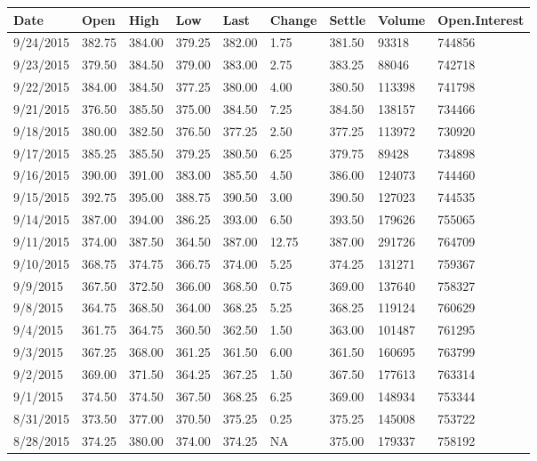 \documentclass[]{book}
\theoremstyle{definition}
\theoremstyle{definition}
\theoremstyle{remark}
\begin{document}
\begin{tabular}{l|l|l|l|l|l|l|l|l}
\hline
Date & Open & High & Low & Last & Change & Settle & Volume & Open.Interest\\
\hline
9/24/2015 & 382.75 & 384.00 & 379.25 & 382.00 & 1.75 & 381.50 & 93318 & 744856\\
\hline
9/23/2015 & 379.50 & 384.50 & 379.00 & 383.00 & 2.75 & 383.25 & 88046 & 742718\\
\hline
9/22/2015 & 384.00 & 384.50 & 377.25 & 380.00 & 4.00 & 380.50 & 113398 & 741798\\
\hline
9/21/2015 & 376.50 & 385.50 & 375.00 & 384.50 & 7.25 & 384.50 & 138157 & 734466\\
\hline
9/18/2015 & 380.00 & 382.50 & 376.50 & 377.25 & 2.50 & 377.25 & 113972 & 730920\\
\hline
9/17/2015 & 385.25 & 385.50 & 379.25 & 380.50 & 6.25 & 379.75 & 89428 & 734898\\
\hline
9/16/2015 & 390.00 & 391.00 & 383.00 & 385.50 & 4.50 & 386.00 & 124073 & 744460\\
\hline
9/15/2015 & 392.75 & 395.00 & 388.75 & 390.50 & 3.00 & 390.50 & 127023 & 744535\\
\hline
9/14/2015 & 387.00 & 394.00 & 386.25 & 393.00 & 6.50 & 393.50 & 179626 & 755065\\
\hline
9/11/2015 & 374.00 & 387.50 & 364.50 & 387.00 & 12.75 & 387.00 & 291726 & 764709\\
\hline
9/10/2015 & 368.75 & 374.75 & 366.75 & 374.00 & 5.25 & 374.25 & 131271 & 759367\\
\hline
9/9/2015 & 367.50 & 372.50 & 366.00 & 368.50 & 0.75 & 369.00 & 137640 & 758327\\
\hline
9/8/2015 & 364.75 & 368.50 & 364.00 & 368.25 & 5.25 & 368.25 & 119124 & 760629\\
\hline
9/4/2015 & 361.75 & 364.75 & 360.50 & 362.50 & 1.50 & 363.00 & 101487 & 761295\\
\hline
9/3/2015 & 367.25 & 368.00 & 361.25 & 361.50 & 6.00 & 361.50 & 160695 & 763799\\
\hline
9/2/2015 & 369.00 & 371.50 & 364.25 & 367.25 & 1.50 & 367.50 & 177613 & 763314\\
\hline
9/1/2015 & 374.50 & 374.50 & 367.50 & 368.25 & 6.25 & 369.00 & 148934 & 753344\\
\hline
8/31/2015 & 373.50 & 377.00 & 370.50 & 375.25 & 0.25 & 375.25 & 145008 & 753722\\
\hline
8/28/2015 & 374.25 & 380.00 & 374.00 & 374.25 & NA & 375.00 & 179337 & 758192\\

\end{tabular}
\end{document}
